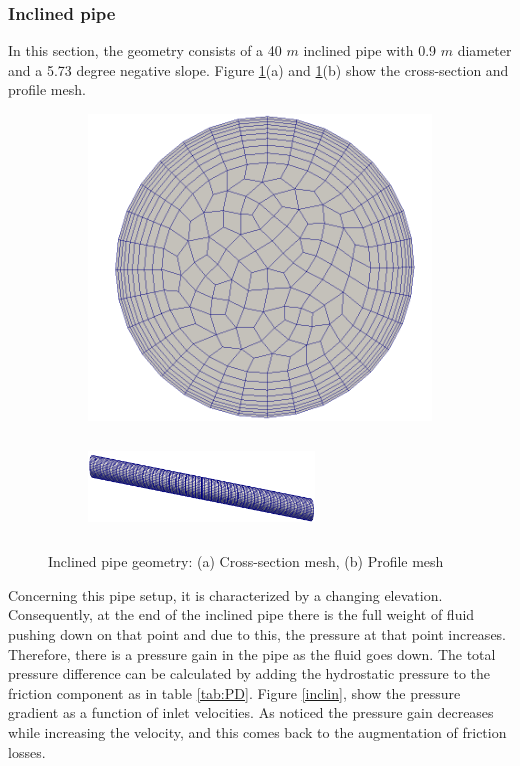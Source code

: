 \documentclass[11pt]{report}
\begin{document}
 \subsubsection{Inclined pipe}\label{inclined}
 In this section, the geometry consists of a 40 $m$ inclined pipe with 0.9 $m$ diameter and a 5.73 degree negative slope. Figure \ref{incline}(a) and \ref{incline}(b) show the
 cross-section and profile mesh.\\
%
\begin{figure}[ht!]
\centering
\begin{subfigure}{0.40\textwidth}
\includegraphics[scale =0.09]{figs/section.png}
\caption{}
\end{subfigure}
\begin{subfigure}{0.40\textwidth}
\includegraphics[width=6cm,height=2.5cm]{figs/IP}
\end{subfigure}
\caption{Inclined pipe geometry: (a) Cross-section mesh, (b) Profile mesh }
\label{incline}
\end{figure}

 Concerning this pipe setup, it is characterized by a changing elevation. 
 Consequently, at the end of the inclined pipe there is the full weight of fluid pushing down on that point and due to this, 
 the pressure at that point increases. 
 Therefore, there is a pressure gain in the pipe as the fluid goes down. 
 The total pressure difference can be calculated by adding the hydrostatic pressure to the friction component as in table \ref{tab:PD}.
 Figure \ref{inclin}, show the pressure gradient as a function of inlet velocities.
 As noticed the pressure gain decreases while increasing the velocity, and this comes back to the augmentation of  friction losses.\\
\end{document}
